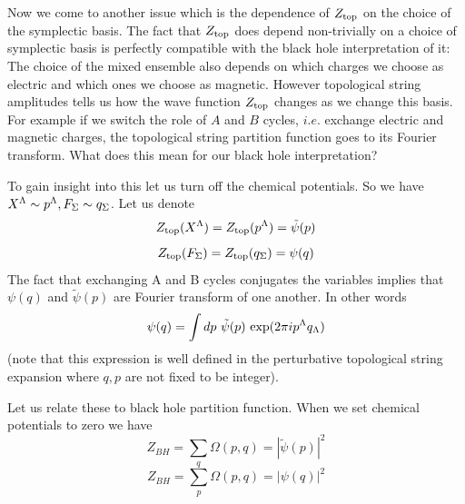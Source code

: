 Now we come to another issue which is the dependence of $Z_{\rm top}$
on the choice of the symplectic basis. The fact that $Z_{\rm top}$
does depend non-trivially on a choice of symplectic basis is
perfectly compatible with the black hole interpretation of it:
The choice of the mixed ensemble also depends on which charges we
choose as electric and which ones we choose as magnetic.  However
topological string amplitudes tells us how the wave function
$Z_{\rm top}$ changes as we change this basis.  For example if we
switch the role of $A$ and $B$ cycles, $i.e.$ exchange electric and
magnetic charges, the topological string partition function goes
to its Fourier transform. What does this mean for our black hole
interpretation?

To gain insight into this let us turn off the chemical potentials.
So we have $X^{\Lambda}\sim p^{\Lambda}, F_\Sigma \sim q_\Sigma  $.  Let us
denote
%
$$Z_{\rm top}(X^{\Lambda})=Z_{\rm top}(p^{\Lambda})=\tilde\psi(p)$$
$$Z_{\rm top}(F_\Sigma )=Z_{\rm top}(q_\Sigma )=\psi(q)$$
%
The fact that exchanging A and B cycles conjugates the variables
implies that $\psi(q)$ and $\tilde\psi(p)$ are Fourier transform
of one another.  In other words
%
$$\psi(q)=\int dp \ \tilde\psi(p)\ {\rm exp}(2\pi i p^{\Lambda} q_{\Lambda})$$
%
(note that this expression is well defined in the perturbative topological
string expansion where $q,p$ are not fixed to be integer).

Let us relate these to black hole partition function.  When we set
chemical potentials to zero we have
%
$$Z_{BH}=\sum_{q} \Omega(p,q)=|\tilde\psi(p)|^2$$
$$Z_{BH}=\sum_{p} \Omega(p,q)=|\psi(q)|^2$$
%


